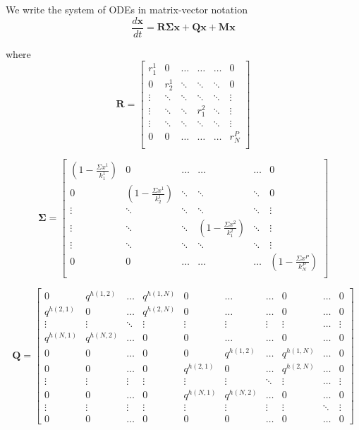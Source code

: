 \documentclass[12pt]{article}
\begin{document}
We write the system of ODEs in matrix-vector notation
\[ \frac{d \mathbf{x}}{dt} = \mathbf{R\Sigma x}  
		 + \mathbf{Qx}
		 + \mathbf{Mx}\] 
		 
where
\[ \mathbf{R} = \begin{bmatrix}
    r_1^1 & 0        & \dots & \dots & \dots & 0  \\
           0 & r_2^1 & \ddots & \ddots & \ddots & 0 \\
   \vdots & \ddots & \ddots & \ddots & \ddots & \vdots \\
   \vdots & \ddots & \ddots &  r_1^2 & \ddots & \vdots  \\
   \vdots & \ddots & \ddots & \ddots & \ddots   & \vdots \\
           0 &         0 &  \dots  & \dots  & \dots & r_N^P \\ \end{bmatrix} \]
           
\[ \mathbf{\Sigma} = \begin{bmatrix}
    (1-\frac{\Sigma x^1}{k_1^1}) & 0        & \dots & \dots & \dots & 0  \\
           0 & (1-\frac{\Sigma x^1}{k_2^1}) & \ddots & \ddots & \ddots & 0 \\
   \vdots & \ddots & \ddots & \ddots & \ddots & \vdots \\
   \vdots & \ddots & \ddots &  (1-\frac{\Sigma x^2}{k_1^2}) & \ddots & \vdots  \\
   \vdots & \ddots & \ddots & \ddots & \ddots   & \vdots \\
           0 &         0 &  \dots  & \dots  & \dots & (1-\frac{\Sigma x^P}{k_N^P}) \\ \end{bmatrix} \]

\[ \mathbf{Q} = \begin{bmatrix}
    0 & q^{h(1,2)}  & \dots & q^{h(1,N)} & 0 & \dots & \dots & 0 & \dots & 0 \\
 q^{h(2,1)} & 0   & \dots & q^{h(2,N)} & 0 & \dots & \dots & 0 & \dots & 0\\
   \vdots & \vdots & \ddots & \vdots & \vdots   & \vdots & \vdots & \vdots & \dots & \vdots\\
       q^{h(N,1)} &  q^{h(N,2)} &   \dots  & 0  & 0 & \dots & \dots & 0 & \dots & 0 \\ 
       0 & 0 & \dots &  0 & 0 & q^{h(1,2)}  & \dots & q^{h(1,N)} & \dots & 0\\
       0 & 0 & \dots &  0 & q^{h(2,1)} & 0 & \dots & q^{h(2,N)}&\dots&0\\
        \vdots & \vdots & \vdots &  \vdots & \vdots & \vdots & \ddots & \vdots & \dots & \vdots\\
          0 & 0 & \dots &  0 & q^{h(N,1)} & q^{h(N,2)} & \dots & 0 & \dots & 0\\	 
          \vdots & \vdots & \vdots & \vdots & \vdots & \vdots & \vdots & \vdots & \ddots & \vdots \\
          0 & 0 & \dots & 0 & 0 & 0 & \dots & 0 & \dots & 0\end{bmatrix}  \]
\end{document}
